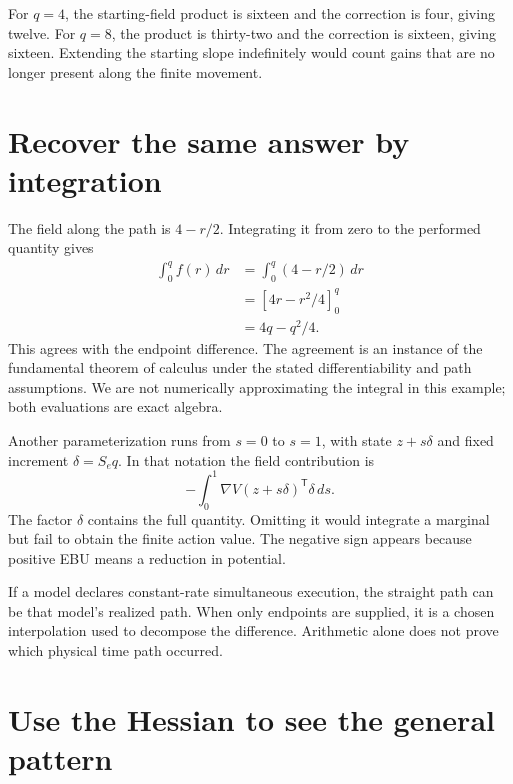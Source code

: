 For \(q=4\), the starting-field product is sixteen and the correction is four, giving twelve. For \(q=8\), the product is thirty-two and the correction is sixteen, giving sixteen. Extending the starting slope indefinitely would count gains that are no longer present along the finite movement.

\section{Recover the same answer by integration}

The field along the path is \(4-r/2\). Integrating it from zero to the performed quantity gives
\begin{align}
\int_0^q f(r)\,dr
&=\int_0^q(4-r/2)\,dr\\
&=\left[4r-r^2/4\right]_0^q\\
&=4q-q^2/4.
\end{align}
This agrees with the endpoint difference. The agreement is an instance of the fundamental theorem of calculus under the stated differentiability and path assumptions. We are not numerically approximating the integral in this example; both evaluations are exact algebra.

Another parameterization runs from \(s=0\) to \(s=1\), with state \(z+s\delta\) and fixed increment \(\delta=S_eq\). In that notation the field contribution is
\begin{equation}
-\int_0^1\nabla V(z+s\delta)^{\mathsf T}\delta\,ds.
\end{equation}
The factor \(\delta\) contains the full quantity. Omitting it would integrate a marginal but fail to obtain the finite action value. The negative sign appears because positive EBU means a reduction in potential.

If a model declares constant-rate simultaneous execution, the straight path can be that model's realized path. When only endpoints are supplied, it is a chosen interpolation used to decompose the difference. Arithmetic alone does not prove which physical time path occurred.

\section{Use the Hessian to see the general pattern}

